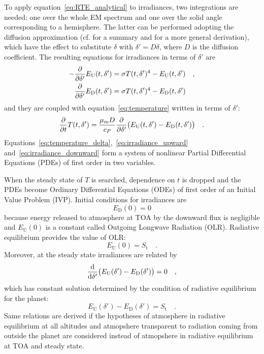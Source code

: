 \documentclass[a4paper,10pt,twocolumn,\classoptions]{article}
\begin{document}
To apply equation~\eqref{eq:RTE_analytical} to irradiances, two integrations are needed: one over the whole EM spectrum and one over the solid angle corresponding to a hemisphere. The latter can be performed adopting the diffusion approximation (cf. \cite[55]{Catling} for a summary and \cite[498]{Modest} for a more general derivation), which have the effect to substitute $\delta$ with $\delta' = D \delta$, where $D$ is the diffusion coefficient.
The resulting equations for irradiances in terms of $\delta'$ are
\begin{align}
  \label{eq:irradiance_upward}
  - \pdv*{E_\text{U}(t, \delta')}{\delta'} & = \sigma T(t, \delta')^4 - E_\text{U}(t, \delta') \quad , \\
  \label{eq:irradiance_downward}
  \pdv*{E_\text{D}(t, \delta')}{\delta'} & = \sigma T(t, \delta')^4 - E_\text{D}(t, \delta')
\end{align}
and they are coupled with equation~\eqref{eq:temperature} written in terms of $\delta'$:
\begin{equation}
  \label{eq:temperature_delta}
  \pdv*{T(t, \delta')}{t} = \frac{\mu_\text{m} D}{c_P} \pdv*{\big( E_\text{U}(t, \delta') - E_\text{D}(t, \delta') \big)}{\delta'}
  \quad .
\end{equation}
Equations~\eqref{eq:temperature_delta},~\eqref{eq:irradiance_upward} and~\eqref{eq:irradiance_downward} form a system of nonlinear Partial Differential Equations (PDEs) of first order in two variables.

When the steady state of $T$ is searched, dependence on $t$ is dropped and the PDEs become Ordinary Differential Equations (ODEs) of first order of an Initial Value Problem (IVP).
Initial conditions for irradiances are
\begin{equation}
  \label{eq:initial_downward}
  E_\text{D}(0) = 0
\end{equation}
because energy released to atmosphere at TOA by the downward flux is negligible and $E_\text{U}(0)$ is a constant called Outgoing Longwave Radiation (OLR). Radiative equilibrium provides the value of OLR:
\begin{equation}
  \label{eq:initial_upward}
  E_\text{U}(0) = S_\text{t}
  \quad .
\end{equation}
Moreover, at the steady state irradiances are related by
\begin{equation}
  \label{eq:irradiance_steady_state}
  \odv*{\big( E_\text{U}(\delta') - E_\text{D}(\delta') \big)}{\delta'} = 0
  \quad ,
\end{equation}
which has constant solution determined by the condition of radiative equilibrium for the planet:
\begin{equation}
  \label{eq:irradiance_steady_state_solution}
  E_\text{U}(\delta') - E_\text{D}(\delta') = S_\text{t}
  \quad .
\end{equation}
Same relations are derived if the hypotheses of atmosphere in radiative equilibrium at all altitudes and atmopshere transparent to radiation coming from outside the planet are considered instead of atmopshere in radiative equilibrium at TOA and steady state.
\end{document}
